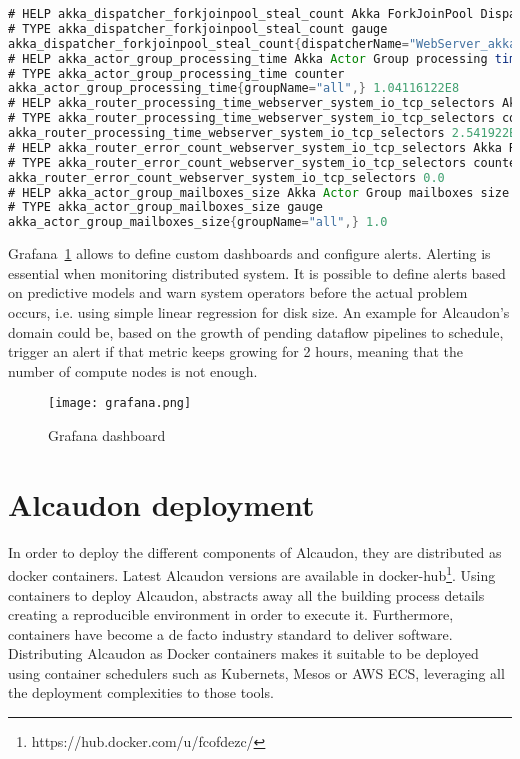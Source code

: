 \begin{lstlisting}[language=scala, frame=trBL, label=code:metricsSample, float=ht, caption = {Example of Alcaudon exposed metrics}]
# HELP akka_dispatcher_forkjoinpool_steal_count Akka ForkJoinPool Dispatcher Steal Count
# TYPE akka_dispatcher_forkjoinpool_steal_count gauge
akka_dispatcher_forkjoinpool_steal_count{dispatcherName="WebServer_akka.actor.default-dispatcher",} 49.0
# HELP akka_actor_group_processing_time Akka Actor Group processing time (Nanos)
# TYPE akka_actor_group_processing_time counter
akka_actor_group_processing_time{groupName="all",} 1.04116122E8
# HELP akka_router_processing_time_webserver_system_io_tcp_selectors Akka Router processing time (Nanos)
# TYPE akka_router_processing_time_webserver_system_io_tcp_selectors counter
akka_router_processing_time_webserver_system_io_tcp_selectors 2.541922E7
# HELP akka_router_error_count_webserver_system_io_tcp_selectors Akka Router errors
# TYPE akka_router_error_count_webserver_system_io_tcp_selectors counter
akka_router_error_count_webserver_system_io_tcp_selectors 0.0
# HELP akka_actor_group_mailboxes_size Akka Actor Group mailboxes size
# TYPE akka_actor_group_mailboxes_size gauge
akka_actor_group_mailboxes_size{groupName="all",} 1.0
\end{lstlisting}

Grafana~\ref{fig:grafana} allows to define custom dashboards and configure
alerts. Alerting is essential when monitoring distributed system. It is possible
to define alerts based on predictive models and warn system operators before
the actual problem occurs, i.e. using simple linear regression for disk
size. An example for Alcaudon's domain could be, based on the growth of pending
dataflow pipelines to schedule, trigger an alert if that metric keeps growing for
2 hours, meaning that the number of compute nodes is not enough.

\begin{figure}[!h]
\begin{center}
\texttt{[image: grafana.png]}
\caption{Grafana dashboard}
\label{fig:grafana}
\end{center}
\end{figure}

\section{Alcaudon deployment}

In order to deploy the different components of Alcaudon, they are distributed as
docker containers. Latest Alcaudon versions are available in
docker-hub\footnote{https://hub.docker.com/u/fcofdezc/}. Using containers to
deploy Alcaudon, abstracts away all the building process details creating a
reproducible environment in order to execute it. Furthermore, containers have become a de
facto industry standard to deliver software. Distributing Alcaudon as Docker
containers makes it suitable to be deployed using container schedulers such as
Kubernets, Mesos or AWS ECS, leveraging all the deployment complexities to those
tools.

